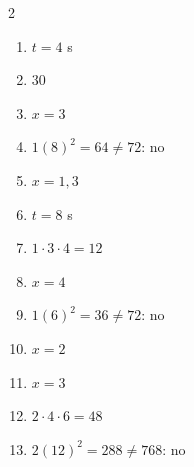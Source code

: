 \documentclass[11pt]{article}
\begin{document}
\begin{keybox}
\begin{multicols}{2}
\small
\begin{enumerate}[leftmargin=*,itemsep=3pt]
  \item $t=4$ s
  \item $30$
  \item $x=3$
  \item $1(8)^2=64\ne72$: no
  \item $x=1,3$
  \item $t=8$ s
  \item $1\cdot3\cdot4=12$
  \item $x=4$
  \item $1(6)^2=36\ne72$: no
  \item $x=2$
  \item $x=3$
  \item $2\cdot4\cdot6=48$
  \item $2(12)^2=288\ne768$: no
\end{enumerate}
\end{multicols}
\end{keybox}
\end{document}
